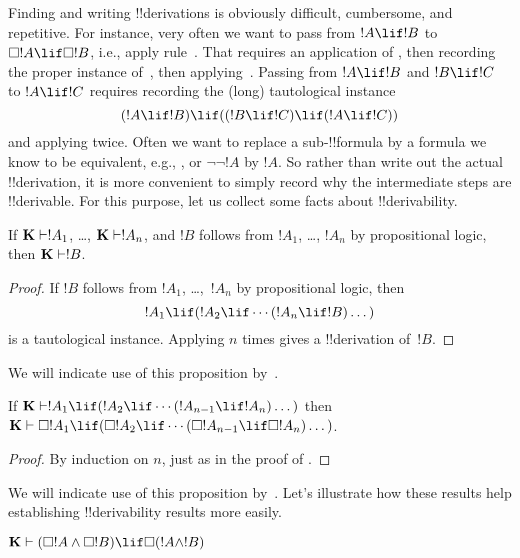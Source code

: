 \documentclass[../../../include/open-logic-section]{subfiles}
\begin{document}


Finding and writing !!{derivation}s is obviously difficult,
cumbersome, and repetitive. For instance, very often we want to pass
from $!A \lif !B$ to $\Box !A \lif \Box !B$, i.e., apply
rule~\RK. That requires an application of \Nec, then recording the
proper instance of~, then applying~\MP. Passing from $!A \lif
!B$ and $!B \lif !C$ to $!A \lif !C$ requires recording the (long)
tautological instance
\[
(!A \lif !B) \lif ((!B \lif !C) \lif (!A \lif !C))
\]
and applying \MP{} twice. Often we want to replace a sub-!!{formula}
by a formula we know to be equivalent, e.g., , or
$\lnot\lnot !A$ by $!A$. So rather than write out the actual
!!{derivation}, it is more convenient to simply record why the
intermediate steps are !!{derivable}. For this purpose, let us collect
some facts about !!{derivability}.

\begin{prop}
  If $\Log{K} \Proves !A_1$, \dots, $\Log{K} \Proves !A_n$, and $!B$
  follows from $!A_1$, \dots, $!A_n$ by propositional logic, then
  $\Log{K} \Proves !B$.
\end{prop}

\begin{proof}
  If $!B$ follows from $!A_1$, \dots,~$!A_n$ by propositional logic, then
  \[
  !A_1 \lif (!A_2 \lif \cdots (!A_n \lif !B)\dots)
  \]
  is a tautological instance. Applying \MP{} $n$ times gives a
  !!{derivation} of~$!B$.
\end{proof}

We will indicate use of this proposition by~\PL.

\begin{prop}
  If $\Log{K} \Proves !A_1 \lif (!A_2 \lif \cdots (!A_{n-1} \lif
  !A_n)\dots)$ then $\Log{K} \Proves \Box !A_1 \lif (\Box !A_2 \lif
  \cdots (\Box !A_{n-1} \lif \Box !A_n)\dots)$.
\end{prop}

\begin{proof}
  By induction on $n$, just as in the proof of .
\end{proof}

We will indicate use of this proposition by~\RK. Let's illustrate how
these results help establishing !!{derivability} results more easily.

\begin{prop}
  $\Log{K} \Proves (\Box!A \land \Box!B) \lif \Box (!A \land !B)$
\end{prop}
\end{document}
